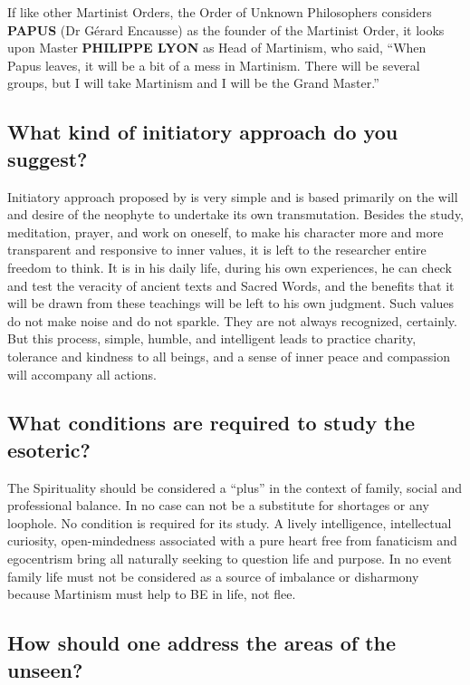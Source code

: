 If like other Martinist Orders, the Order of Unknown Philosophers considers \textbf{PAPUS} (Dr
Gérard Encausse) as the founder of the Martinist Order, it looks upon Master \textbf{PHILIPPE
LYON} as Head of Martinism, who said, ``When Papus leaves, it will be
a bit of a mess in Martinism. There will be several groups, but I will take Martinism and I
will be the Grand Master.''

\subsection*{What kind of initiatory approach do you suggest?}

Initiatory approach proposed by \moup{} is very simple
and is based primarily on the will and desire of the neophyte to undertake its own
transmutation. Besides the study, meditation, prayer, and work on oneself, to make his
character more and more transparent and responsive to inner values, it is left to the
researcher entire freedom to think. It is in his daily life, during his own experiences, he can
check and test the veracity of ancient texts and Sacred Words, and the benefits that it will
be drawn from these teachings will be left to his own judgment. Such values do not make
noise and do not sparkle. They are not always recognized, certainly. But this process,
simple, humble, and intelligent leads to practice charity, tolerance and kindness to all
beings, and a sense of inner peace and compassion will accompany all actions.

\subsection*{What conditions are required to study the esoteric?}

The Spirituality should be considered a ``plus'' in the context of family, social and
professional balance. In no case can not be a substitute for shortages or any loophole. No
condition is required for its study. A lively intelligence, intellectual curiosity, open-mindedness associated with a pure heart free from fanaticism and egocentrism bring all
naturally seeking to question life and purpose. In no event family life must not be
considered as a source of imbalance or disharmony because Martinism must help to BE in
life, not flee.

\subsection*{How should one address the areas of the unseen?}

